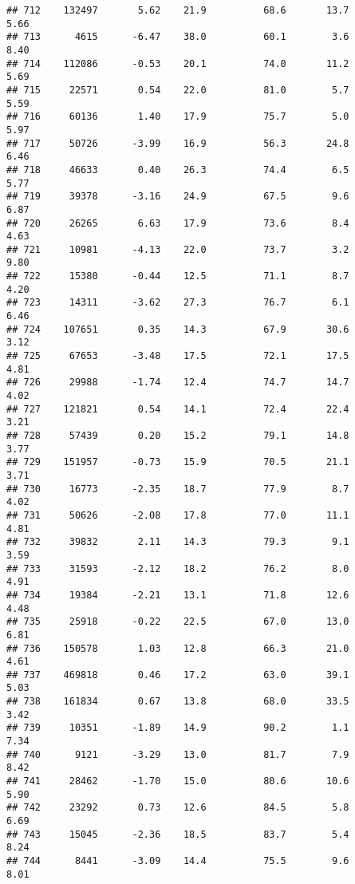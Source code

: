 \documentclass[
]{article}
\begin{document}
\begin{verbatim}
## 712    132497       5.62    21.9          68.6       13.7              5.66
## 713      4615      -6.47    38.0          60.1        3.6              8.40
## 714    112086      -0.53    20.1          74.0       11.2              5.69
## 715     22571       0.54    22.0          81.0        5.7              5.59
## 716     60136       1.40    17.9          75.7        5.0              5.97
## 717     50726      -3.99    16.9          56.3       24.8              6.46
## 718     46633       0.40    26.3          74.4        6.5              5.77
## 719     39378      -3.16    24.9          67.5        9.6              6.87
## 720     26265       6.63    17.9          73.6        8.4              4.63
## 721     10981      -4.13    22.0          73.7        3.2              9.80
## 722     15380      -0.44    12.5          71.1        8.7              4.20
## 723     14311      -3.62    27.3          76.7        6.1              6.46
## 724    107651       0.35    14.3          67.9       30.6              3.12
## 725     67653      -3.48    17.5          72.1       17.5              4.81
## 726     29988      -1.74    12.4          74.7       14.7              4.02
## 727    121821       0.54    14.1          72.4       22.4              3.21
## 728     57439       0.20    15.2          79.1       14.8              3.77
## 729    151957      -0.73    15.9          70.5       21.1              3.71
## 730     16773      -2.35    18.7          77.9        8.7              4.02
## 731     50626      -2.08    17.8          77.0       11.1              4.81
## 732     39832       2.11    14.3          79.3        9.1              3.59
## 733     31593      -2.12    18.2          76.2        8.0              4.91
## 734     19384      -2.21    13.1          71.8       12.6              4.48
## 735     25918      -0.22    22.5          67.0       13.0              6.81
## 736    150578       1.03    12.8          66.3       21.0              4.61
## 737    469818       0.46    17.2          63.0       39.1              5.03
## 738    161834       0.67    13.8          68.0       33.5              3.42
## 739     10351      -1.89    14.9          90.2        1.1              7.34
## 740      9121      -3.29    13.0          81.7        7.9              8.42
## 741     28462      -1.70    15.0          80.6       10.6              5.90
## 742     23292       0.73    12.6          84.5        5.8              6.69
## 743     15045      -2.36    18.5          83.7        5.4              8.24
## 744      8441      -3.09    14.4          75.5        9.6              8.01

\end{verbatim}
\end{document}
